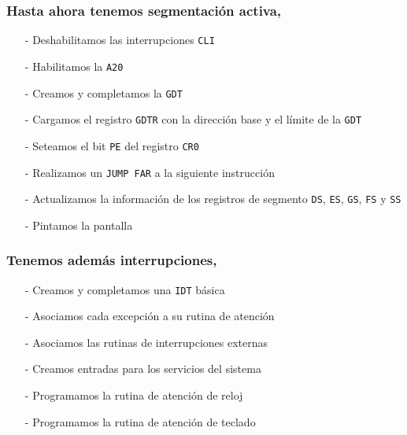 \documentclass[aspectratio=169]{beamer}
\begin{document}
\begin{frame}
    \frametitle{Hasta ahora tenemos segmentación activa,}
    \begin{itemize}
    \setlength\itemsep{0.3cm}
    \item[-] Deshabilitamos las interrupciones \texttt{CLI}
    \item[-] Habilitamos la \texttt{A20}
    \item[-] Creamos y completamos la \texttt{GDT}
    \item[-] Cargamos el registro \texttt{GDTR} con la dirección base y el límite de la \texttt{GDT}
    \item[-] Seteamos el bit \texttt{PE} del registro \texttt{CR0}
    \pause
    \item[-] Realizamos un \texttt{JUMP FAR} a la siguiente instrucción
    \item[-] Actualizamos la información de los registros de segmento \texttt{DS}, \texttt{ES}, \texttt{GS}, \texttt{FS} y \texttt{SS}
    \item[-] Pintamos la pantalla
    \end{itemize}
\end{frame}

\begin{frame}
    \frametitle{Tenemos además interrupciones,}
    \begin{itemize}
    \setlength\itemsep{0.3cm}
    \item[-] Creamos y completamos una \texttt{IDT} básica
    \item[-] Asociamos cada excepción a su rutina de atención
    \item[-] Asociamos las rutinas de interrupciones externas
    \pause
    \item[-] Creamos entradas para los servicios del sistema
    \item[-] Programamos la rutina de atención de reloj
    \item[-] Programamos la rutina de atención de teclado
    \end{itemize}
\end{frame}
\end{document}
